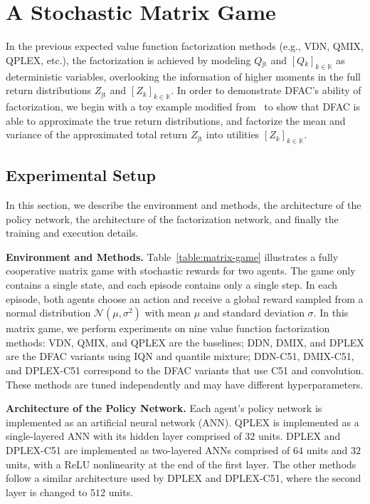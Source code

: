 \documentclass[twoside,11pt]{article}
\newcommand{\agentspace}{\mathbb{K}}
\newcommand{\agentcounter}{k}
\newcommand{\utilityexp}{Q}
\newcommand{\utility}{Z}
\newcommand{\joint}{\mathrm{jt}}
\newcounter{example0}
\begin{document}
 \section{A Stochastic Matrix Game}
\label{sec:distributional_2_step_game}

In the previous expected value function factorization methods (e.g., VDN, QMIX, QPLEX, etc.), the factorization is achieved by modeling $\utilityexp{}_{\joint{}}$ and $[\utilityexp{}_{\agentcounter{}}]_{\agentcounter{}\in\agentspace{}}$ as deterministic variables, overlooking the information of higher moments in the full return distributions $\utility{}_{\joint{}}$ and $[\utility{}_{\agentcounter{}}]_{\agentcounter{}\in\agentspace{}}$.
In order to demonstrate DFAC's ability of factorization, we begin with a toy example modified from~\cite{Wang2020QPLEX} to show that DFAC is able to approximate the true return distributions, and factorize the mean and variance of the approximated total return $\utility{}_{\joint{}}$ into utilities $[\utility{}_{\agentcounter{}}]_{\agentcounter{}\in\agentspace{}}$.



\subsection{Experimental Setup}
\label{subsec:matrix_game_setup}

In this section, we describe the environment and methods, the architecture of the policy network, the architecture of the factorization network, and finally the training and execution details.

\textbf{Environment and Methods.}
Table~\ref{table:matrix-game} illustrates a fully cooperative matrix game with stochastic rewards for two agents. The game only contains a single state, and each episode contains only a single step. In each episode, both agents choose an action and receive a global reward sampled from a normal distribution $\mathcal{N}(\mu,\sigma^2)$ with mean $\mu$ and standard deviation $\sigma$.
In this matrix game, we perform experiments on nine value function factorization methods: VDN, QMIX, and QPLEX are the baselines; DDN, DMIX, and DPLEX are the DFAC variants using IQN and quantile mixture; DDN-C51, DMIX-C51, and DPLEX-C51 correspond to the DFAC variants that use C51 and convolution. These methods are tuned independently and may have different hyperparameters.

\textbf{Architecture of the Policy Network.}
Each agent's policy network is implemented as an artificial neural network (ANN). QPLEX is implemented as a single-layered ANN with its hidden layer comprised of $32$ units. DPLEX and DPLEX-C51 are implemented as two-layered ANNs comprised of $64$ units and $32$ units, with a ReLU nonlinearity at the end of the first layer. The other methods follow a similar architecture used by DPLEX and DPLEX-C51, where the second layer is changed to $512$ units.
\end{document}
